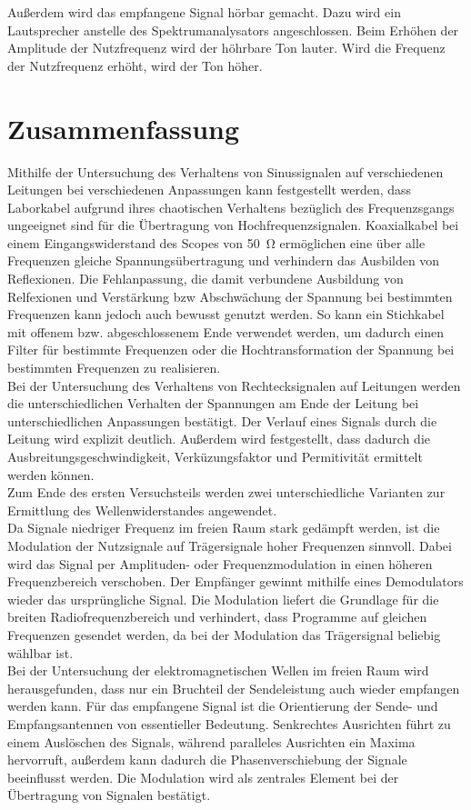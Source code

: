 \documentclass[a4paper,twoside,final]{article}
\begin{document}
Außerdem wird das empfangene Signal hörbar gemacht. Dazu wird ein Lautsprecher anstelle des Spektrumanalysators angeschlossen. Beim Erhöhen der Amplitude der Nutzfrequenz wird der höhrbare Ton lauter. Wird die Frequenz der Nutzfrequenz erhöht, wird der Ton höher.
\section{Zusammenfassung}
Mithilfe der Untersuchung des Verhaltens von Sinussignalen auf verschiedenen Leitungen bei verschiedenen Anpassungen kann festgestellt werden, dass Laborkabel aufgrund ihres chaotischen Verhaltens bezüglich des Frequenzsgangs ungeeignet sind für die Übertragung von Hochfrequenzsignalen. Koaxialkabel bei einem Eingangswiderstand des Scopes von \SI{50}{\ohm} ermöglichen eine über alle Frequenzen gleiche Spannungsübertragung und verhindern das Ausbilden von Reflexionen. Die Fehlanpassung, die damit verbundene Ausbildung von Relfexionen und Verstärkung bzw Abschwächung der Spannung bei bestimmten Frequenzen kann jedoch auch bewusst genutzt werden. So kann ein Stichkabel mit offenem bzw. abgeschlossenem Ende verwendet werden, um dadurch einen Filter für bestimmte Frequenzen oder die Hochtransformation der Spannung bei bestimmten Frequenzen zu realisieren. \\
Bei der Untersuchung des Verhaltens von Rechtecksignalen auf Leitungen werden die unterschiedlichen Verhalten der Spannungen am Ende der Leitung bei unterschiedlichen Anpassungen bestätigt. Der Verlauf eines Signals durch die Leitung wird explizit deutlich. Außerdem wird festgestellt, dass dadurch die Ausbreitungsgeschwindigkeit, Verküzungsfaktor und Permitivität ermittelt werden können.\\ Zum Ende des ersten Versuchsteils werden zwei unterschiedliche Varianten zur Ermittlung des Wellenwiderstandes angewendet.\\
Da Signale niedriger Frequenz im freien Raum stark gedämpft werden, ist die Modulation der Nutzsignale auf Trägersignale hoher Frequenzen sinnvoll. Dabei wird das Signal per Amplituden- oder Frequenzmodulation in einen höheren Frequenzbereich verschoben. Der Empfänger gewinnt mithilfe eines Demodulators wieder das ursprüngliche Signal. Die Modulation liefert die Grundlage für die breiten Radiofrequenzbereich und verhindert, dass Programme auf gleichen Frequenzen gesendet werden, da bei der Modulation das Trägersignal beliebig wählbar ist.\\
Bei der Untersuchung der elektromagnetischen Wellen im freien Raum wird herausgefunden, dass nur ein Bruchteil der Sendeleistung auch wieder empfangen werden kann. Für das empfangene Signal ist die Orientierung der Sende- und Empfangsantennen von essentieller Bedeutung. Senkrechtes Ausrichten führt zu einem Auslöschen des Signals, während paralleles Ausrichten ein Maxima hervorruft, außerdem kann dadurch die Phasenverschiebung der Signale beeinflusst werden. Die Modulation wird als zentrales Element bei der Übertragung von Signalen bestätigt.
\end{document}
